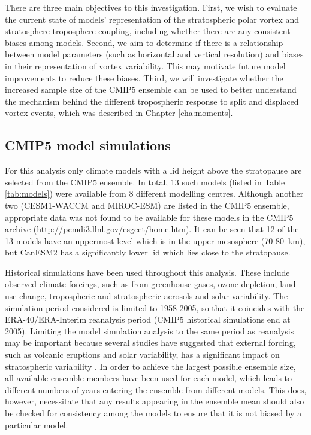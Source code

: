 There are three main objectives to this investigation. First, we wish to
evaluate the current state of models' representation of the stratospheric polar
vortex and stratosphere-troposphere coupling, including whether there are any
consistent biases among models. Second, we aim to determine if there is a
relationship between model parameters (such as horizontal and vertical
resolution) and biases in their representation of vortex variability. This may
motivate future model improvements to reduce these biases. Third, we will
investigate whether the increased sample size of the CMIP5 ensemble can be used
to better understand the mechanism behind the different tropospheric response to
split and displaced vortex events, which was described in Chapter
\ref{cha:moments}.

\subsection{CMIP5 model simulations}

For this analysis only climate models with a lid height above the stratopause
are selected from the CMIP5 ensemble. In total, 13 such models (listed in Table
\ref{tab:models}) were available from 8 different modelling centres. Although
another two (CESM1-WACCM and MIROC-ESM) are listed in the CMIP5 ensemble,
appropriate data was not found to be available for these models in the CMIP5
archive (\url{http://pcmdi3.llnl.gov/esgcet/home.htm}). It can be seen that 12
of the 13 models have an uppermost level which is in the upper mesosphere
(70-80~km), but CanESM2 has a significantly lower lid which lies close to the
stratopause.

Historical simulations have been used throughout this analysis. These include
observed climate forcings, such as from greenhouse gases, ozone depletion,
land-use change, tropospheric and stratospheric aerosols and solar
variability. The simulation period considered is limited to 1958-2005, so that
it coincides with the ERA-40/ERA-Interim reanalysis period (CMIP5 historical
simulations end at 2005). Limiting the model simulation analysis to the same
period as reanalysis may be important because several studies have suggested
that external forcing, such as volcanic eruptions and solar variability, has a
significant impact on stratospheric variability
\citep[e.g.,][]{Robock2000,Gray2010}. In order to achieve the largest possible
ensemble size, all available ensemble members have been used for each model,
which leads to different numbers of years entering the ensemble from different
models. This does, however, necessitate that any results appearing in the
ensemble mean should also be checked for consistency among the models to ensure
that it is not biased by a particular model.

